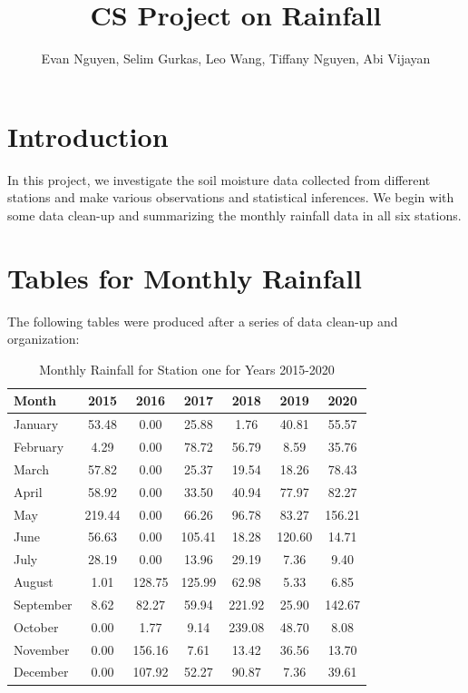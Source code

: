 \documentclass[12pt]{article}
\title{CS Project on Rainfall}
\author{Evan Nguyen, Selim Gurkas, Leo Wang, Tiffany Nguyen, Abi Vijayan}
\theoremstyle{definition}
\begin{document}
\maketitle


\section{Introduction}
In this project, we investigate the soil moisture data collected from different stations and make various observations and statistical inferences. We begin with some data clean-up and summarizing the monthly rainfall data in all six stations.


\section{Tables for Monthly Rainfall}
The following tables were produced after a series of data clean-up and organization:
\begin{table}[ht]
  \centering
  \caption{Monthly Rainfall for Station one for Years 2015-2020}
  \label{tab:station1}
  \begin{tabular}{l *{6}{S[table-format=3.2]}}
    \toprule
    \textbf{Month} & \textbf{2015} & \textbf{2016} & \textbf{2017} & \textbf{2018} & \textbf{2019} & \textbf{2020} \\
    \midrule
    January  & 53.48 &  0.00 & 25.88 &  1.76 & 40.81 & 55.57 \\
    February &  4.29 &  0.00 & 78.72 & 56.79 &  8.59 & 35.76 \\
    March    & 57.82 &  0.00 & 25.37 & 19.54 & 18.26 & 78.43 \\
    April    & 58.92 &  0.00 & 33.50 & 40.94 & 77.97 & 82.27 \\
    May      &219.44 &  0.00 & 66.26 & 96.78 & 83.27 &156.21 \\
    June     & 56.63 &  0.00 &105.41 & 18.28 &120.60 & 14.71 \\
    July     & 28.19 &  0.00 & 13.96 & 29.19 &  7.36 &  9.40 \\
    August   &  1.01 &128.75 &125.99 & 62.98 &  5.33 &  6.85 \\
    September&  8.62 & 82.27 & 59.94 &221.92 & 25.90 &142.67 \\
    October  &  0.00 &  1.77 &  9.14 &239.08 & 48.70 &  8.08 \\
    November &  0.00 &156.16 &  7.61 & 13.42 & 36.56 & 13.70 \\
    December &  0.00 &107.92 & 52.27 & 90.87 &  7.36 & 39.61 \\
    \bottomrule
  \end{tabular}
\end{table}
\end{document}
